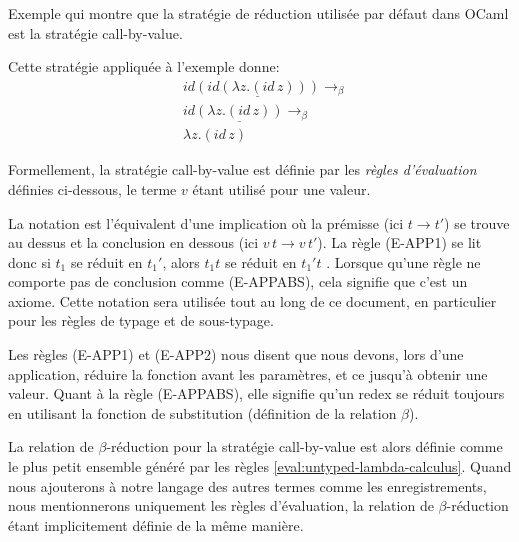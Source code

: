 \begin{listing}
  \inputminted{OCaml}{codes/untyped-call-by-value-example.ml}
  \caption{Exemple qui montre que la stratégie de réduction utilisée par défaut
    dans OCaml est la stratégie call-by-value.}
\end{listing}

Cette stratégie appliquée à l'exemple donne:
\begin{align*}
  & id \underline{(id (\lambda z . (id \, z)))} \rightarrow_{\beta}\\
  & id \underline{(\lambda z . (id \, z))} \rightarrow_{\beta} \\
  & \lambda z . (id \, z)
\end{align*}

\label{fig:untyped-lambda-calculus-evaluation-rules}

Formellement, la stratégie call-by-value est définie par les \textit{règles
  d'évaluation} définies ci-dessous, le terme $v$ étant utilisé pour une valeur.

\label{eval:untyped-lambda-calculus}

La notation  est
l'équivalent d'une implication où la prémisse (ici $t \rightarrow t'$) se trouve au dessus et la
conclusion en dessous (ici $v \, t \rightarrow v \, t'$). La règle (E-APP1) se lit
donc \og si $t_{1}$ se réduit en $t_{1}'$, alors $t_{1} t$ se réduit en
$t_{1}'t$ \fg. Lorsque qu'une règle
ne comporte pas de conclusion comme (E-APPABS), cela signifie que c'est un axiome.
Cette notation sera
utilisée tout au long de ce document, en particulier pour les règles de typage
et de sous-typage.

Les règles (E-APP1) et (E-APP2) nous disent que nous devons, lors d'une
application, réduire la fonction avant les paramètres, et ce jusqu'à obtenir une
valeur. Quant à la règle (E-APPABS), elle signifie qu'un redex se réduit toujours
en utilisant la fonction de substitution (définition de la relation $\beta$).

La relation de $\beta$-réduction pour la stratégie call-by-value est alors
définie comme le plus petit ensemble généré par les règles
\ref{eval:untyped-lambda-calculus}. Quand nous ajouterons à notre langage des
autres termes comme les enregistrements, nous mentionnerons uniquement les
règles d'évaluation, la relation de $\beta$-réduction étant implicitement
définie de la même manière.

